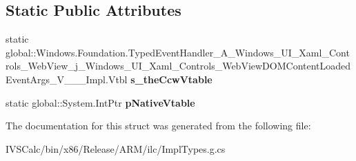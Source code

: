 \subsection*{Static Public Attributes}
\begin{DoxyCompactItemize}
\item 
\mbox{\label{struct_windows_1_1_foundation_1_1_typed_event_handler___a___windows___u_i___xaml___controls___we5ac43aef74fa54d3107343c3c79b75ac_a43a213a371f647f375962158a3186090}} 
static global\+::\+Windows.\+Foundation.\+Typed\+Event\+Handler\+\_\+\+A\+\_\+\+Windows\+\_\+\+U\+I\+\_\+\+Xaml\+\_\+\+Controls\+\_\+\+Web\+View\+\_\+j\+\_\+\+Windows\+\_\+\+U\+I\+\_\+\+Xaml\+\_\+\+Controls\+\_\+\+Web\+View\+D\+O\+M\+Content\+Loaded\+Event\+Args\+\_\+\+V\+\_\+\+\_\+\+\_\+\+Impl.\+Vtbl {\bfseries s\+\_\+the\+Ccw\+Vtable}
\item 
\mbox{\label{struct_windows_1_1_foundation_1_1_typed_event_handler___a___windows___u_i___xaml___controls___we5ac43aef74fa54d3107343c3c79b75ac_acb2e5ceb5bdcb0c04f80edd8235c0d88}} 
static global\+::\+System.\+Int\+Ptr {\bfseries p\+Native\+Vtable}
\end{DoxyCompactItemize}


The documentation for this struct was generated from the following file\+:\begin{DoxyCompactItemize}
\item 
I\+V\+S\+Calc/bin/x86/\+Release/\+A\+R\+M/ilc/Impl\+Types.\+g.\+cs\end{DoxyCompactItemize}
